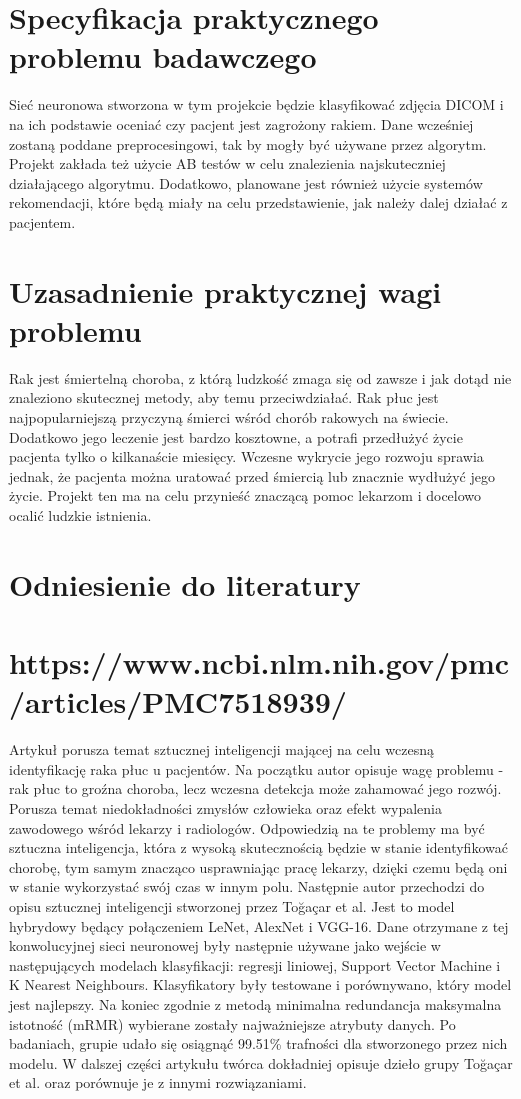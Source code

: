 \documentclass[10pt]{article}
\begin{document}
\section{Specyfikacja praktycznego problemu badawczego}
Sieć neuronowa stworzona w tym projekcie będzie klasyfikować zdjęcia DICOM i na ich podstawie oceniać czy pacjent jest zagrożony rakiem. Dane wcześniej zostaną poddane preprocesingowi, tak by mogły być używane przez algorytm. Projekt zakłada też użycie AB testów w celu znalezienia najskuteczniej działającego algorytmu. Dodatkowo, planowane jest również użycie systemów rekomendacji, które będą miały na celu przedstawienie, jak należy dalej działać z pacjentem.

\section{Uzasadnienie praktycznej wagi problemu}
Rak jest śmiertelną choroba, z którą ludzkość zmaga się od zawsze i jak dotąd nie znaleziono skutecznej metody, aby temu przeciwdziałać. Rak płuc jest najpopularniejszą przyczyną śmierci wśród chorób rakowych na świecie. Dodatkowo jego leczenie jest bardzo kosztowne, a potrafi przedłużyć życie pacjenta tylko o kilkanaście miesięcy. Wczesne wykrycie jego rozwoju sprawia jednak, że pacjenta można uratować przed śmiercią lub znacznie wydłużyć jego życie. Projekt ten ma na celu przynieść znaczącą pomoc lekarzom i docelowo ocalić ludzkie istnienia.

\section{Odniesienie do literatury}
\section{https://www.ncbi.nlm.nih.gov/pmc/articles/PMC7518939/}
Artykuł porusza temat sztucznej inteligencji mającej na celu wczesną identyfikację raka płuc u pacjentów. Na początku autor opisuje wagę problemu - rak płuc to groźna choroba, lecz wczesna detekcja może zahamować jego rozwój. Porusza temat niedokładności zmysłów człowieka oraz efekt wypalenia zawodowego wśród lekarzy i radiologów. Odpowiedzią na te problemy ma być sztuczna inteligencja, która z wysoką skutecznością będzie w stanie identyfikować chorobę, tym samym znacząco usprawniając pracę lekarzy, dzięki czemu będą oni w stanie wykorzystać swój czas w innym polu. Następnie autor przechodzi do opisu sztucznej inteligencji stworzonej przez Toğaçar et al. Jest to model hybrydowy będący połączeniem LeNet, AlexNet i VGG-16. Dane otrzymane z tej konwolucyjnej sieci neuronowej były następnie używane jako wejście w następujących modelach klasyfikacji: regresji liniowej, Support Vector Machine i K Nearest Neighbours. Klasyfikatory były testowane i porównywano, który model jest najlepszy. Na koniec zgodnie z metodą minimalna redundancja maksymalna istotność (mRMR) wybierane zostały najważniejsze atrybuty danych. Po badaniach, grupie udało się osiągnąć 99.51\% trafności dla stworzonego przez nich modelu. W dalszej części artykułu twórca dokładniej opisuje dzieło grupy Toğaçar et al. oraz porównuje je z innymi rozwiązaniami.
\end{document}
